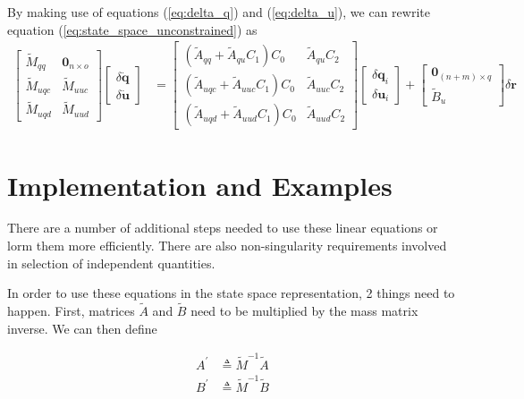 \documentclass{svjour3}                     %
\begin{document}
By making use of equations (\ref{eq:delta_q}) and (\ref{eq:delta_u}), we can
rewrite equation (\ref{eq:state_space_unconstrained}) as
\begin{align}
  \label{eq:state_space_constrained}
  \left[
    \begin{array}{cc}
      \tilde{M}_{qq} & \bm{0}_{n \times o} \\
      \tilde{M}_{uqc} & \tilde{M}_{uuc} \\
      \tilde{M}_{uqd} & \tilde{M}_{uud}
    \end{array}
    \right]
    \left[
      \begin{array}{c}
        \delta \bm{\dot{q}} \\
        \delta \bm{\dot{u}}
      \end{array}
    \right]
   &=
   \left[
     \begin{array}{cc}
       (\tilde{A}_{qq} + \tilde{A}_{qu} C_1 ) C_0 & \tilde{A}_{qu} C_2 \\
       (\tilde{A}_{uqc} + \tilde{A}_{uuc} C_1 ) C_0 & \tilde{A}_{uuc} C_2\\
       (\tilde{A}_{uqd} + \tilde{A}_{uud} C_1 ) C_0 & \tilde{A}_{uud} C_2
     \end{array}
   \right]
    \left[
      \begin{array}{c}
        \delta \bm{q}_i \\
        \delta \bm{u}_i
      \end{array}
    \right]
    +
    \left[
      \begin{array}{c}
        \bm{0}_{(n+m) \times q} \\
        \tilde{B}_{u}
      \end{array}
    \right]
    \delta \bm{r}
\end{align}


\section{Implementation and Examples}

There are a number of additional steps needed to use these linear equations or
lorm them more efficiently. There are also non-singularity requirements
involved in selection of independent quantities.

In order to use these equations in the state space representation, 2 things
need to happen. First, matrices $\tilde{A}$ and $\tilde{B}$ need to be
multiplied by the mass matrix inverse. We can then define

\begin{align}
    A^\prime &\triangleq \tilde{M}^{-1} \tilde{A} \\
    B^\prime &\triangleq \tilde{M}^{-1} \tilde{B}
\end{align}
\end{document}
